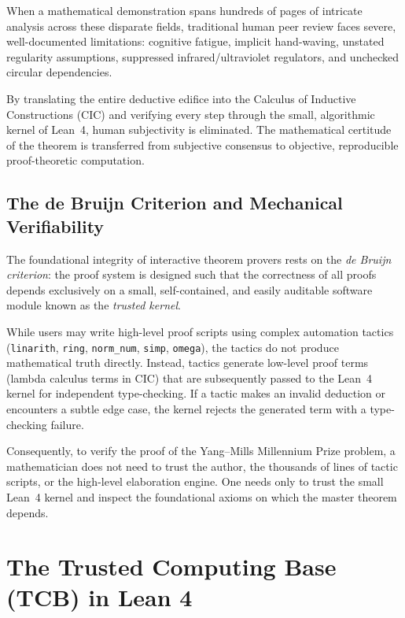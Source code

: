 When a mathematical demonstration spans hundreds of pages of intricate analysis across these disparate fields, traditional human peer review faces severe, well-documented limitations: cognitive fatigue, implicit hand-waving, unstated regularity assumptions, suppressed infrared/ultraviolet regulators, and unchecked circular dependencies. 

By translating the entire deductive edifice into the Calculus of Inductive Constructions (CIC) and verifying every step through the small, algorithmic kernel of Lean~4, human subjectivity is eliminated. The mathematical certitude of the theorem is transferred from subjective consensus to objective, reproducible proof-theoretic computation.

\subsection{The de Bruijn Criterion and Mechanical Verifiability}
\label{subsec:debruijn_criterion}

The foundational integrity of interactive theorem provers rests on the \emph{de Bruijn criterion}: the proof system is designed such that the correctness of all proofs depends exclusively on a small, self-contained, and easily auditable software module known as the \emph{trusted kernel}. 

While users may write high-level proof scripts using complex automation tactics (\texttt{linarith}, \texttt{ring}, \texttt{norm\_num}, \texttt{simp}, \texttt{omega}), the tactics do not produce mathematical truth directly. Instead, tactics generate low-level proof terms (lambda calculus terms in CIC) that are subsequently passed to the Lean~4 kernel for independent type-checking. If a tactic makes an invalid deduction or encounters a subtle edge case, the kernel rejects the generated term with a type-checking failure.

Consequently, to verify the proof of the Yang--Mills Millennium Prize problem, a mathematician does not need to trust the author, the thousands of lines of tactic scripts, or the high-level elaboration engine. One needs only to trust the small Lean~4 kernel and inspect the foundational axioms on which the master theorem depends.

\section{The Trusted Computing Base (TCB) in Lean 4}
\label{sec:tcb_lean4}


